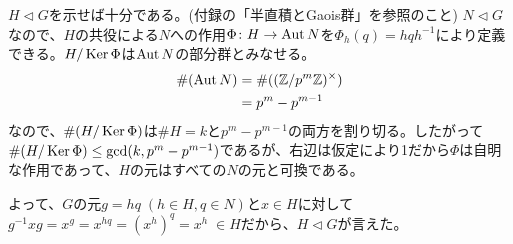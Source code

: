 \newpage





\begin{sol}
  $H \lhd G$を示せば十分である。(付録の「半直積とGaois群」を参照のこと) $N \lhd G$なので、$H$の共役による$N$への作用$\Phi \colon H \rightarrow \operatorname{Aut} N$を$\Phi_h(q)=hqh^{-1}$により定義できる。$H / \operatorname{Ker} \Phi$は$\operatorname{Aut} N$の部分群とみなせる。
  \begin{align*}
    \#(\operatorname{Aut} N) &= \#(({\mathbb Z}/ p^m {\mathbb Z})^{\times}) \\
    &= p^m - p^{m-1}
  \end{align*}
  なので、$\#(H / \operatorname{Ker} \Phi)$は$\# H= k$と$ p^m - p^{m-1}$の両方を割り切る。したがって$\#(H / \operatorname{Ker} \Phi) \leq \gcd (k,p^m - p^{m-1})$であるが、右辺は仮定により1だから$\Phi$は自明な作用であって、$H$の元はすべての$N$の元と可換である。

  よって、$G$の元$g=hq \; (h \in H, q \in N)$と$x \in H$に対して$g^{-1}xg = x^g =x^{hq} = (x^h)^q = x^h \; \in H$だから、$H \lhd G$が言えた。
\end{sol}

\newpage


